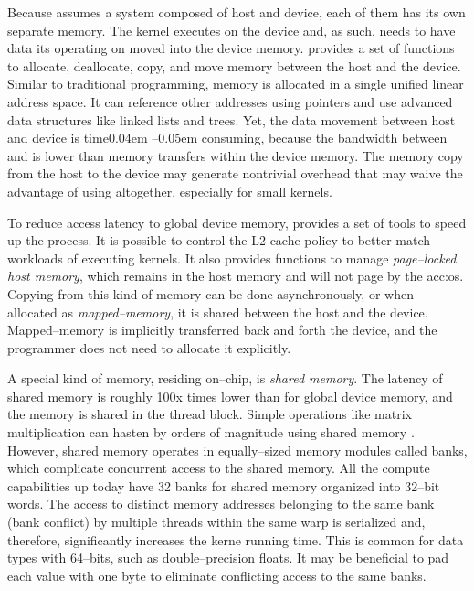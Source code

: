 Because \cuda assumes a system composed of host and device, each of them has its own separate memory. The kernel executes on the device and, as such, needs to have data its operating on moved into the device memory. \cuda provides a set of functions to allocate, deallocate, copy, and move memory between the host and the device. Similar to traditional \cpp programming, \cuda memory is allocated in a single unified linear address space. It can reference other addresses using pointers and use advanced data structures like linked lists and trees. Yet, the data movement between host and device is time\kern0.04em --\kern0.05em consuming, because the bandwidth between \cpu and \gpu is lower than memory transfers within the device memory. The memory copy from the host to the device may generate nontrivial overhead that may waive the advantage of using \gpu altogether, especially for small kernels. 

To reduce access latency to global device memory, \cuda provides a set of tools to speed up the process. It is possible to control the L2 cache policy to better match workloads of executing kernels. It also provides functions to manage \emph{page--locked host memory}, which remains in the host memory and will not page by the \acrshort{acc:os}. Copying from this kind of memory can be done asynchronously, or when allocated as \emph{mapped--memory}, it is shared between the host and the device. Mapped--memory is implicitly transferred back and forth the device, and the programmer does not need to allocate it explicitly.

A special kind of memory, residing on--chip, is \emph{shared memory}. The latency of shared memory is roughly 100x times lower than for global device memory, and the memory is shared in the thread block. Simple operations like matrix multiplication can hasten by orders of magnitude using shared memory \mbox{\citep{MatrixMultiplicationGPU}}. However, shared memory operates in equally--sized memory modules called banks, which complicate concurrent access to the shared memory. All the compute capabilities up today have 32 banks for shared memory organized into 32--bit words. The access to distinct memory addresses belonging to the same bank (bank conflict) by multiple threads within the same warp is serialized and, therefore, significantly increases the kerne running time. This is common for data types with 64--bits, such as double--precision floats. It may be beneficial to pad each value with one byte to eliminate conflicting access to the same banks.

